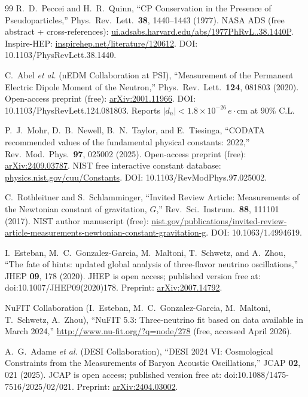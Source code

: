﻿\documentclass[reprint,amsmath,amssymb,aps,prd,longbibliography,floatfix]{revtex4-2}
\begin{document}
\begin{thebibliography}{99}
 R.~D.~Peccei and H.~R.~Quinn,
``CP Conservation in the Presence of Pseudoparticles,''
Phys.\ Rev.\ Lett.\ \textbf{38}, 1440--1443 (1977).
NASA ADS (free abstract + cross-references):
\href{https://ui.adsabs.harvard.edu/abs/1977PhRvL..38.1440P/abstract}{ui.adsabs.harvard.edu/abs/1977PhRvL..38.1440P}.
Inspire-HEP: \href{https://inspirehep.net/literature/120612}{inspirehep.net/literature/120612}.
DOI: 10.1103/PhysRevLett.38.1440.

 C.~Abel \textit{et al.} (nEDM Collaboration at PSI),
``Measurement of the Permanent Electric Dipole Moment of the Neutron,''
Phys.\ Rev.\ Lett.\ \textbf{124}, 081803 (2020).
Open-access preprint (free): \href{https://arxiv.org/abs/2001.11966}{arXiv:2001.11966}.
DOI: 10.1103/PhysRevLett.124.081803.
Reports $|d_n| < 1.8 \times 10^{-26}\,e\cdot\text{cm}$ at 90\% C.L.

 P.~J.~Mohr, D.~B.~Newell, B.~N.~Taylor, and E.~Tiesinga,
``CODATA recommended values of the fundamental physical constants: 2022,''
Rev.\ Mod.\ Phys.\ \textbf{97}, 025002 (2025).
Open-access preprint (free): \href{https://arxiv.org/abs/2409.03787}{arXiv:2409.03787}.
NIST free interactive constant database:
\href{https://physics.nist.gov/cuu/Constants/}{physics.nist.gov/cuu/Constants}.
DOI: 10.1103/RevModPhys.97.025002.

 C.~Rothleitner and S.~Schlamminger,
``Invited Review Article: Measurements of the Newtonian constant of gravitation, $G$,''
Rev.\ Sci.\ Instrum.\ \textbf{88}, 111101 (2017).
NIST author manuscript (free):
\href{https://www.nist.gov/publications/invited-review-article-measurements-newtonian-constant-gravitation-g}{nist.gov/publications/invited-review-article-measurements-newtonian-constant-gravitation-g}.
DOI: 10.1063/1.4994619.

 I.~Esteban, M.~C.~Gonzalez-Garcia, M.~Maltoni,
T.~Schwetz, and A.~Zhou,
``The fate of hints: updated global analysis of three-flavor neutrino oscillations,''
JHEP \textbf{09}, 178 (2020).
JHEP is open access; published version free at:
doi:10.1007/JHEP09(2020)178.
Preprint: \href{https://arxiv.org/abs/2007.14792}{arXiv:2007.14792}.

 NuFIT Collaboration (I.~Esteban, M.~C.~Gonzalez-Garcia,
M.~Maltoni, T.~Schwetz, A.~Zhou),
``NuFIT 5.3: Three-neutrino fit based on data available in March 2024,''
\url{http://www.nu-fit.org/?q=node/278} (free, accessed April 2026).

 A.~G.~Adame \textit{et al.} (DESI Collaboration),
``DESI 2024 VI: Cosmological Constraints from the Measurements of Baryon Acoustic Oscillations,''
JCAP \textbf{02}, 021 (2025).
JCAP is open access; published version free at:
doi:10.1088/1475-7516/2025/02/021.
Preprint: \href{https://arxiv.org/abs/2404.03002}{arXiv:2404.03002}.


\end{thebibliography}
\end{document}
